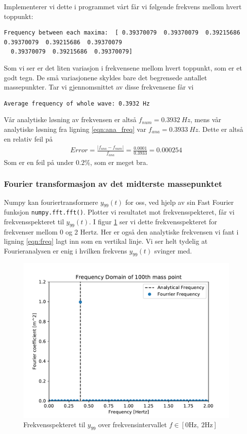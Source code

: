 \documentclass[12p,a4paper]{report}
\begin{document}
Implementerer vi dette i programmet vårt får vi følgende frekvens mellom hvert toppunkt:
\begin{lstlisting}[frame = single]
Frequency between each maxima:  [ 0.39370079  0.39370079  0.39215686  0.39370079  0.39215686  0.39370079
  0.39370079  0.39215686  0.39370079]	
\end{lstlisting}
Som vi ser er det liten variasjon i frekvensene mellom hvert toppunkt, som er et godt tegn. De små variasjonene skyldes bare det begrensede antallet massepunkter. Tar vi gjennomsnittet av disse frekvensene får vi
\begin{lstlisting}[frame = single]
Average frequency of whole wave: 0.3932 Hz
\end{lstlisting}
Vår analytiske løsning av frekvensen er altså $f_{num} = \SI{0.3932}{Hz}$, mens vår analytiske løsning fra ligning \ref{eqn:ana_freq} var $f_{ana} = \SI{0.3933}{Hz}$. Dette er altså en relativ feil på
\begin{align*}
Error = \frac{|f_{ana} - f_{num}|}{f_{ana}} = \frac{0.0001}{0.3933} = 0.000254
\end{align*}
Som er en feil på under $0.2\%$, som er meget bra.



\subsubsection*{Fourier transformasjon av det midterste massepunktet}
Numpy kan fouriertransformere $y_{99}(t)$ for oss, ved hjelp av sin Fast Fourier funksjon \texttt{numpy.fft.fft()}. Plotter vi resultatet mot frekvensspekteret, får vi frekvensspekteret til $y_{99}(t)$. I figur \ref{fig:100_point_fourier} ser vi dette frekvensspekteret for frekvenser mellom 0 og 2 Hertz. Her er også den analytiske frekvensen vi fant i ligning \ref{eqn:freq} lagt inn som en vertikal linje. Vi ser helt tydelig at Fourieranalysen er enig i hvilken frekvens $y_{99}(t)$ svinger med. 
\begin{figure}[H]
\centering
\includegraphics[width=\textwidth]{../fig/100_point_fourier.pdf}
\caption{Frekvensspekteret til $y_{99}$ over frekvensintervallet $f\in [0\mathrm{Hz},\ 2\mathrm{Hz}]$}
\label{fig:100_point_fourier}
\end{figure}
\end{document}
